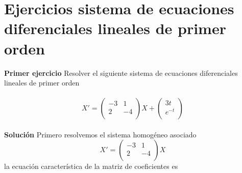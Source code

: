 \documentclass[11.5pt]{article}
\begin{document}
\section{ Ejercicios sistema de ecuaciones diferenciales lineales de primer orden }

\textbf{Primer ejercicio} Resolver  el siguiente sistema de ecuaciones diferenciales  lineales de primer orden\\
 \vspace{0.2cm}\\
\begin{equation}
X'=\begin{pmatrix}
-3&1\\
2&-4\\
\end{pmatrix}
X+
\begin{pmatrix}
3t\\
e^{-t}\\
\end{pmatrix}
\end{equation}
\vspace{0.2cm}\\
\textbf{Solución} Primero resolvemos el sistema homogéneo asociado
\vspace{0.2cm}\\
\begin{equation}
X'=\begin{pmatrix}
-3&1\\
2&-4\\
\end{pmatrix}
X
\end{equation}
la ecuación característica de la matriz de coeficientes es
\vspace{0.2cm}\\
 
\end{document}
